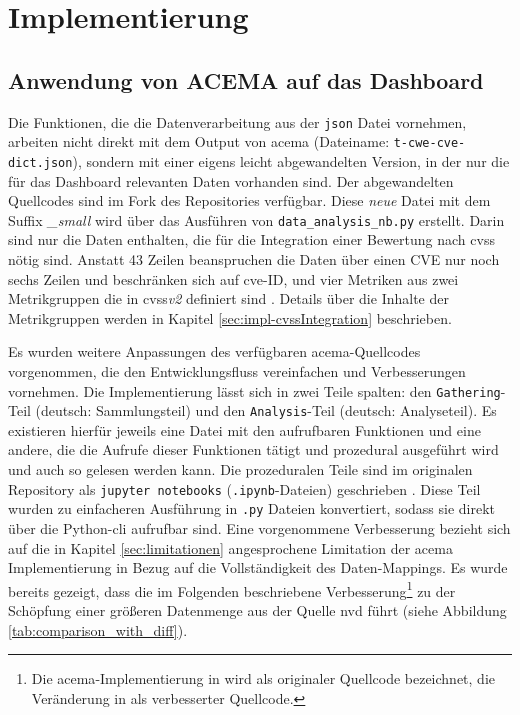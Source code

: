 \chapter{Implementierung}
\label{chap:implementierung}
\section[Anwendung von ACEMA]{Anwendung von ACEMA auf das Dashboard}
\label{sec:impl-anwendungVonAcema}

Die Funktionen, die die Datenverarbeitung aus der \verb|json| Datei vornehmen, arbeiten nicht direkt mit dem Output von \gls{acema} (Dateiname: \verb|t-cwe-cve-dict.json|), sondern mit einer eigens leicht abgewandelten Version, in der nur die für das Dashboard relevanten Daten vorhanden sind. Der abgewandelten Quellcodes sind im Fork \autocite{DumpeldownAcema_oranDev} des Repositories \autocite{FklementAcema_oranCode}  verfügbar. Diese \textit{neue} Datei mit dem Suffix \textit{\_small} wird über das Ausführen von \verb|data_analysis_nb.py| erstellt. Darin sind nur die Daten enthalten, die für die Integration einer Bewertung nach \gls{cvss} nötig sind. Anstatt 43 Zeilen beanspruchen die Daten über einen CVE nur noch sechs Zeilen und beschränken sich auf \gls{cve}-ID, und vier Metriken aus zwei Metrikgruppen die in \gls{cvss}\textit{v2} definiert sind \autocite{CVSSV2Complete}. Details über die Inhalte der Metrikgruppen werden in Kapitel \ref{sec:impl-cvssIntegration} beschrieben.

Es wurden weitere Anpassungen des verfügbaren \gls{acema}-Quellcodes vorgenommen, die den Entwicklungsfluss vereinfachen und Verbesserungen vornehmen. Die Implementierung lässt sich in zwei Teile spalten: den \verb|Gathering|-Teil (deutsch: Sammlungsteil) und den \verb|Analysis|-Teil (deutsch: Analyseteil). Es existieren hierfür jeweils eine Datei mit den aufrufbaren Funktionen und eine andere, die die Aufrufe dieser Funktionen tätigt und prozedural ausgeführt wird und auch so gelesen werden kann.
Die prozeduralen Teile sind im originalen Repository als \verb|jupyter notebooks| (\verb|.ipynb|-Dateien) geschrieben \autocite{FklementAcema_oranCode} \autocite{ProjectJupyter}. Diese Teil wurden zu einfacheren Ausführung in \verb|.py| Dateien konvertiert, sodass sie direkt über die Python-\gls{cli} aufrufbar sind.
Eine vorgenommene Verbesserung bezieht sich auf die in Kapitel \ref{sec:limitationen} angesprochene Limitation der \gls{acema} Implementierung in Bezug auf die Vollständigkeit des Daten-Mappings. Es wurde bereits gezeigt, dass die im Folgenden beschriebene Verbesserung\footnote{Die \gls{acema}-Implementierung in \autocite{FklementAcema_oranCode} wird als originaler Quellcode bezeichnet, die Veränderung in \autocite{DumpeldownAcema_oranDev} als verbesserter Quellcode.} zu der Schöpfung einer größeren Datenmenge aus der Quelle \gls{nvd} führt (siehe Abbildung \ref{tab:comparison_with_diff}).

